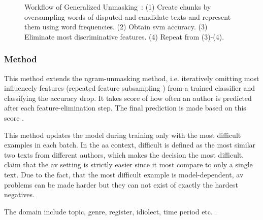     






\begin{figure}[htbp]
    \centering
    
    \caption{Workflow of Generalized Unmasking~\citep{bevendorff_generalizing_2019}: (1) Create chunks by oversampling words of disputed and candidate texts and represent them using word frequencies. (2) Obtain \ac{svm} accuracy. (3) Eliminate most discriminative features. (4) Repeat from (3)-(4).}
    \label{fig:generalized_unmasking}
\end{figure}



  
\subsubsection{\imp{} Method}
\label{sec:impostor_method_theory}


\begin{definition}
    This method extends the ngram-unmasking method, i.e. iteratively omitting most influencely features (repeated feature subsampling \citep{koppel_determining_2014})
    from a trained classifier and classifying the accuracy drop.
    It takes score of how often an author is predicted after each feature-elimination step.
    The final prediction is made based on this score \citep{tyo_state_2022}.
\end{definition}


\begin{definition}
    This method updates the model during training only with the most difficult examples in each batch.
    In the \ac{aa} context, difficult is defined as the most similar two texts from different authors, 
    which makes the decision the most difficult.
    \citet{tyo_state_2022} claim that the \ac{av} setting is strictly easier since 
    it most compare to only a single text.
    Due to the fact, that the most difficult example is model-dependent, \ac{av} problems can be made harder 
    but they can not exist of exactly the hardest negatives.
\end{definition}


\begin{definition}
    [Domain]
    The domain include topic, genre, register, idiolect, time period etc. \citep{bischoff_importance_2020}.
\end{definition}
  
